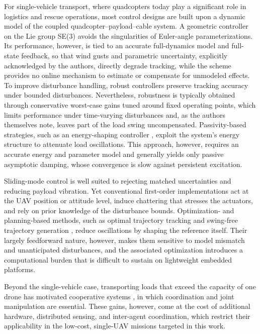 \documentclass[sn-mathphys-num]{sn-jnl}
\theoremstyle{thmstyleone}%
\theoremstyle{thmstyletwo}%
\theoremstyle{thmstylethree}%
\begin{document}
For single-vehicle transport, where quadcopters today play a significant role in logistics and rescue operations, most control designs are built upon a dynamic model of the coupled quadcopter--payload--cable system. A geometric controller on the Lie group SE(3) \cite{goodarzi2014geometric} avoids the singularities of Euler-angle parameterizations. Its performance, however, is tied to an accurate full-dynamics model and full-state feedback, so that wind gusts and parametric uncertainty, explicitly acknowledged by the authors, directly degrade tracking, while the scheme provides no online mechanism to estimate or compensate for unmodeled effects. To improve disturbance handling, robust controllers \cite{qian2019path,barikbin2019trajectory} preserve tracking accuracy under bounded disturbances. Nevertheless, robustness is typically obtained through conservative worst-case gains tuned around fixed operating points, which limits performance under time-varying disturbances and, as the authors themselves note, leaves part of the load swing uncompensated. Passivity-based strategies, such as an energy-shaping controller \cite{guerrero2015passivity}, exploit the system's energy structure to attenuate load oscillations. This approach, however, requires an accurate energy and parameter model and generally yields only passive asymptotic damping, whose convergence is slow against persistent excitation.

Sliding-mode control \cite{kusznir2020sliding} is well suited to rejecting matched uncertainties and reducing payload vibration. Yet conventional first-order implementations act at the UAV position or attitude level, induce chattering that stresses the actuators, and rely on prior knowledge of the disturbance bounds. Optimization- and planning-based methods, such as optimal trajectory tracking \cite{akhtar2022path} and swing-free trajectory generation \cite{palunko2012trajectory}, reduce oscillations by shaping the reference itself. Their largely feedforward nature, however, makes them sensitive to model mismatch and unanticipated disturbances, and the associated optimization introduces a computational burden that is difficult to sustain on lightweight embedded platforms.

Beyond the single-vehicle case, transporting loads that exceed the capacity of one drone has motivated cooperative systems \cite{maza2009multi,michael2011cooperative}, in which coordination and joint manipulation are essential. These gains, however, come at the cost of additional hardware, distributed sensing, and inter-agent coordination, which restrict their applicability in the low-cost, single-UAV missions targeted in this work.
\end{document}
